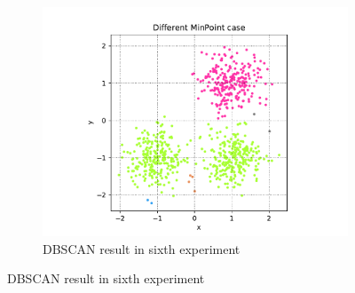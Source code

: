 \begin{figure}[h]
\begin{subfigure}{0.33\textwidth}
		\includegraphics[width=\linewidth]{figures/6-MinPoint}
		\caption{DBSCAN result in sixth experiment}
		\label{fig:p2-3}
	\end{subfigure}	
	

\end{figure}
